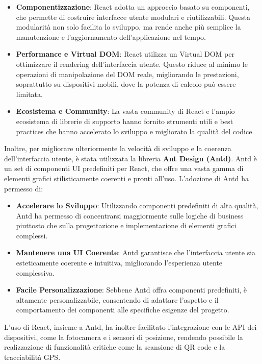 \documentclass[twoside]{supsistudent}
\begin{document}
\begin{itemize}
  \item \textbf{Componentizzazione}: React adotta un approccio basato su componenti, che permette di costruire interfacce utente modulari e riutilizzabili. Questa modularità non solo facilita lo sviluppo, ma rende anche più semplice la manutenzione e l'aggiornamento dell'applicazione nel tempo.
  \item \textbf{Performance e Virtual DOM}: React utilizza un Virtual DOM per ottimizzare il rendering dell'interfaccia utente. Questo riduce al minimo le operazioni di manipolazione del DOM reale, migliorando le prestazioni, soprattutto su dispositivi mobili, dove la potenza di calcolo può essere limitata.
  \item \textbf{Ecosistema e Community}: La vasta community di React e l'ampio ecosistema di librerie di supporto hanno fornito strumenti utili e best practices che hanno accelerato lo sviluppo e migliorato la qualità del codice.
\end{itemize}

Inoltre, per migliorare ulteriormente la velocità di sviluppo e la coerenza dell'interfaccia utente, è stata utilizzata la libreria \textbf{Ant Design (Antd)}. Antd è un set di componenti UI predefiniti per React, che offre una vasta gamma di elementi grafici stilisticamente coerenti e pronti all'uso. L'adozione di Antd ha permesso di:

\begin{itemize}
  \item \textbf{Accelerare lo Sviluppo}: Utilizzando componenti predefiniti di alta qualità, Antd ha permesso di concentrarsi maggiormente sulle logiche di business piuttosto che sulla progettazione e implementazione di elementi grafici complessi.
  \item \textbf{Mantenere una UI Coerente}: Antd garantisce che l'interfaccia utente sia esteticamente coerente e intuitiva, migliorando l'esperienza utente complessiva.
  \item \textbf{Facile Personalizzazione}: Sebbene Antd offra componenti predefiniti, è altamente personalizzabile, consentendo di adattare l'aspetto e il comportamento dei componenti alle specifiche esigenze del progetto.
\end{itemize}

L'uso di React, insieme a Antd, ha inoltre facilitato l'integrazione con le API dei dispositivi, come la fotocamera e i sensori di posizione, rendendo possibile la realizzazione di funzionalità critiche come la scansione di QR code e la tracciabilità GPS.
\end{document}
